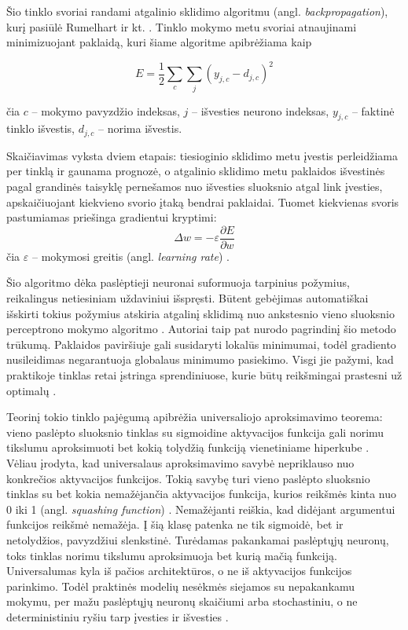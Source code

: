 

Šio tinklo svoriai randami atgalinio sklidimo algoritmu (angl. \textit{backpropagation}), kurį pasiūlė Rumelhart ir kt. \cite{rumelhart1986}.
Tinklo mokymo metu svoriai atnaujinami minimizuojant paklaidą, kuri šiame algoritme apibrėžiama kaip

\begin{equation}
    E = \frac{1}{2} \sum_{c}\sum_{j} \left(y_{j,c} - d_{j,c}\right)^2
    \label{eq:nt-paklaida}
\end{equation}

čia $c$ -- mokymo pavyzdžio indeksas, $j$ -- išvesties neurono indeksas, $y_{j,c}$ -- faktinė tinklo išvestis, $d_{j,c}$ -- norima išvestis.

Skaičiavimas vyksta dviem etapais: tiesioginio sklidimo metu įvestis perleidžiama per tinklą ir gaunama prognozė, o atgalinio sklidimo metu paklaidos išvestinės pagal grandinės taisyklę pernešamos nuo išvesties sluoksnio atgal link įvesties, apskaičiuojant kiekvieno svorio įtaką bendrai paklaidai.
Tuomet kiekvienas svoris pastumiamas priešinga gradientui kryptimi:
\begin{equation}
    \Delta w = -\varepsilon \frac{\partial E}{\partial w}
    \label{eq:svoriu-korekcija}
\end{equation}
čia $\varepsilon$ -- mokymosi greitis (angl. \textit{learning rate}) \cite{rumelhart1986}.

Šio algoritmo dėka paslėptieji neuronai suformuoja tarpinius požymius, reikalingus netiesiniam uždaviniui išspręsti.
Būtent gebėjimas automatiškai išskirti tokius požymius atskiria atgalinį sklidimą nuo ankstesnio vieno sluoksnio perceptrono mokymo algoritmo \cite{rumelhart1986}.
Autoriai taip pat nurodo pagrindinį šio metodo trūkumą.
Paklaidos paviršiuje gali susidaryti lokalūs minimumai, todėl gradiento nusileidimas negarantuoja globalaus minimumo pasiekimo.
Visgi jie pažymi, kad praktikoje tinklas retai įstringa sprendiniuose, kurie būtų reikšmingai prastesni už optimalų \cite{rumelhart1986}.

Teorinį tokio tinklo pajėgumą apibrėžia universaliojo aproksimavimo teorema: vieno paslėpto sluoksnio tinklas su sigmoidine aktyvacijos funkcija gali norimu tikslumu aproksimuoti bet kokią tolydžią funkciją vienetiniame hiperkube \cite{cybenko1989}.
Vėliau įrodyta, kad universalaus aproksimavimo savybė nepriklauso nuo konkrečios aktyvacijos funkcijos.
Tokią savybę turi vieno paslėpto sluoksnio tinklas su bet kokia nemažėjančia aktyvacijos funkcija, kurios reikšmės kinta nuo 0 iki 1 (angl. \textit{squashing function}) \cite{hornik1989}.
Nemažėjanti reiškia, kad didėjant argumentui funkcijos reikšmė nemažėja.
Į šią klasę patenka ne tik sigmoidė, bet ir netolydžios, pavyzdžiui slenkstinė.
Turėdamas pakankamai paslėptųjų neuronų, toks tinklas norimu tikslumu aproksimuoja bet kurią mačią funkciją.
Universalumas kyla iš pačios architektūros, o ne iš aktyvacijos funkcijos parinkimo.
Todėl praktinės modelių nesėkmės siejamos su nepakankamu mokymu, per mažu paslėptųjų neuronų skaičiumi arba stochastiniu, o ne deterministiniu ryšiu tarp įvesties ir išvesties \cite{hornik1989}.

